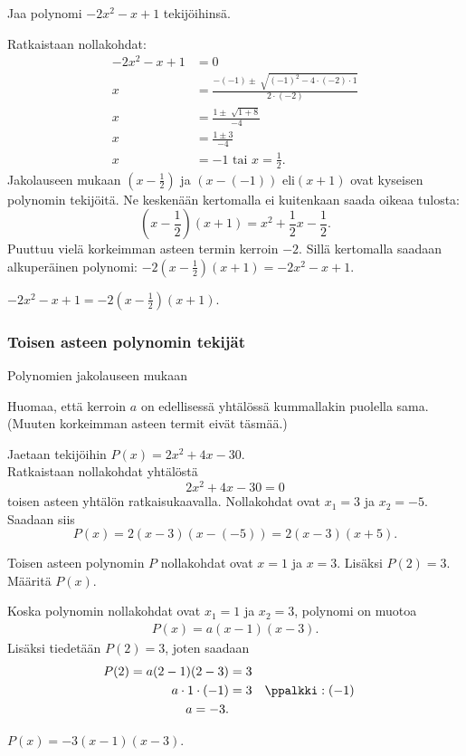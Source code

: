 \begin{esimerkki}
Jaa polynomi $-2x^2-x+1$ tekijöihinsä.
\begin{esimratk}
Ratkaistaan nollakohdat:
\begin{align*}
-2x^2-x+1&=0 \\
x&=\frac{-(-1) \pm \sqrt[]{(-1)^2-4 \cdot (-2) \cdot 1}}{2 \cdot (-2)} \\
x&=\frac{1 \pm \sqrt[]{1+8}}{-4} \\
x&=\frac{1 \pm 3}{-4} \\
x&=-1 \textrm{ tai } x = \frac{1}{2}.
\end{align*}
Jakolauseen mukaan $(x-\frac{1}{2})$ ja $(x-(-1))$ eli$(x+1)$ ovat kyseisen polynomin tekijöitä.
Ne keskenään kertomalla ei kuitenkaan saada oikeaa tulosta:
$$\left(x-\frac{1}{2}\right)(x+1)=x^2+\frac{1}{2}x-\frac{1}{2}.$$
Puuttuu vielä korkeimman asteen termin kerroin $-2$. Sillä kertomalla saadaan alkuperäinen polynomi:
$-2\left(x-\frac{1}{2}\right)(x+1)=-2x^2-x+1$.
\end{esimratk}
\begin{esimvast}
$-2x^2-x+1 = -2(x-\frac{1}{2})(x+1)$.
\end{esimvast}
\end{esimerkki}

\subsubsection*{Toisen asteen polynomin tekijät}

Polynomien jakolauseen mukaan

Huomaa, että kerroin $a$ on edellisessä yhtälössä kummallakin puolella sama.
(Muuten korkeimman asteen termit eivät täsmää.)

\begin{esimerkki}
Jaetaan tekijöihin $P(x)=2x^2 + 4x-30$. \\
Ratkaistaan nollakohdat yhtälöstä $$2x^2 + 4x-30=0$$ toisen asteen yhtälön ratkaisukaavalla.
Nollakohdat ovat $x_1=3$ ja $x_2=-5$. Saadaan siis
$$P(x)= 2(x-3)(x-(-5)) = 2(x-3)(x+5).$$
\end{esimerkki}

\begin{esimerkki}
Toisen asteen polynomin $P$ nollakohdat ovat $x=1$ ja $x=3$. Lisäksi $P(2)=3$.
Määritä $P(x)$.
\begin{esimratk}
Koska polynomin nollakohdat ovat $x_1=1$ ja $x_2=3$, polynomi on muotoa
\begin{align*} P(x)=a(x-1)(x-3). \end{align*}
Lisäksi tiedetään $P(2)=3$, joten saadaan
\begin{align*}
P(2) = a(2-1)(2-3) &= 3 \\
	a \cdot 1 \cdot (-1) &= 3	&& \ppalkki : (-1) \\
	a = -3.
\end{align*}
\end{esimratk}
\begin{esimvast}
$P(x)=-3(x-1)(x-3)$.
\end{esimvast}
\end{esimerkki}

